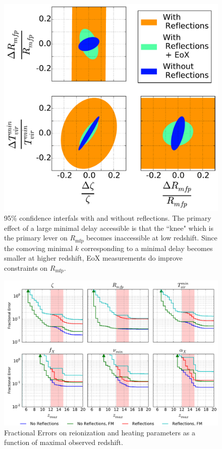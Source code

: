 \documentclass[onecolumn]{emulateapj}
\begin{document}
\begin{figure}
\includegraphics[width=.5\textwidth]{figures/reionization_triangle_compare.pdf}
\caption{95\% confidence interfals with and without reflections. The primary effect of a large minimal delay accessible is that  the ``knee" which is the primary lever on $R_\text{mfp}$ becomes inaccessible at low redshift. Since the comoving minimal $k$ corresponding to a minimal delay becomes smaller at higher redshift, EoX measurements do improve constraints on $R_\text{mfp}$. }
\end{figure}


\begin{figure}
\includegraphics[width=\textwidth]{figures/sigmaVsZ.pdf}
\caption{Fractional Errors on reionization and heating parameters as a function of maximal observed redshift.}
\end{figure}
\end{document}

